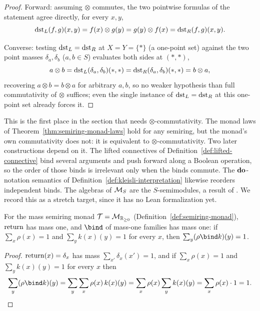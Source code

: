\begin{proof}
\leanok
Forward: assuming $\otimes$ commutes, the two pointwise formulas of the
statement agree directly, for every $x,y$,
\[
  \mathrm{dst}_L(f,g)(x,y) = f(x)\otimes g(y) = g(y)\otimes f(x) = \mathrm{dst}_R(f,g)(x,y).
\]

Converse: testing $\mathrm{dst}_L=\mathrm{dst}_R$ at $X=Y=\{*\}$ (a one-point set) against
the two point masses $\delta_a,\delta_b$ ($a,b\in S$) evaluates both
sides at $(*,*)$,
\[
  a\otimes b = \mathrm{dst}_L(\delta_a,\delta_b)(*,*) = \mathrm{dst}_R(\delta_a,\delta_b)(*,*) = b\otimes a,
\]
recovering $a\otimes b = b\otimes a$ for arbitrary $a,b$, so no weaker
hypothesis than full commutativity of $\otimes$ suffices; even the
single instance of $\mathrm{dst}_L=\mathrm{dst}_R$ at this one-point set already forces
it.
\end{proof}

This is the first place in the section that needs
$\otimes$-commutativity. The monad laws of
Theorem~\ref{thm:semiring-monad-laws} hold for any semiring, but
the monad's own commutativity does not: it is equivalent to
$\otimes$-commutativity. Two later constructions depend on it.
The lifted connectives of Definition~\ref{def:lifted-connective}
bind several arguments and push forward along a Boolean
operation, so the order of those binds is irrelevant only when
the binds commute. The $\mathbf{do}$-notation semantics of
Definition~\ref{def:kleisli-interpretation} likewise reorders
independent binds. The algebras of $\mathcal M_{S}$ are the
$S$-semimodules, a result of \citet{coumansJacobsScalars2013}. We
record this as a stretch target, since it has no Lean formalization
yet.

\begin{lemma}
\label{lem:dist-closure}
\leanok
For the mass semiring monad $\mathcal T = \mathcal M_{\mathbb R_{\ge 0}}$
(Definition~\ref{def:semiring-monad}), $\mathrm{return}$ has mass one, and
$\bind$ of mass-one families has mass one: if $\sum_x \rho(x) = 1$ and
$\sum_y k(x)(y) = 1$ for every $x$, then $\sum_y (\rho \bind k)(y) = 1$.
\end{lemma}

\begin{proof}
\leanok
$\mathrm{return}(x)=\delta_x$ has mass
$\sum_{x'}\delta_x(x')=1$, and if $\sum_x\rho(x)=1$ and
$\sum_y k(x)(y)=1$ for every $x$ then
\[
  \sum_y (\rho \bind k)(y) = \sum_y\sum_x \rho(x)\,k(x)(y)
  = \sum_x \rho(x) \sum_y k(x)(y) = \sum_x \rho(x)\cdot 1 = 1.
\]
\end{proof}

